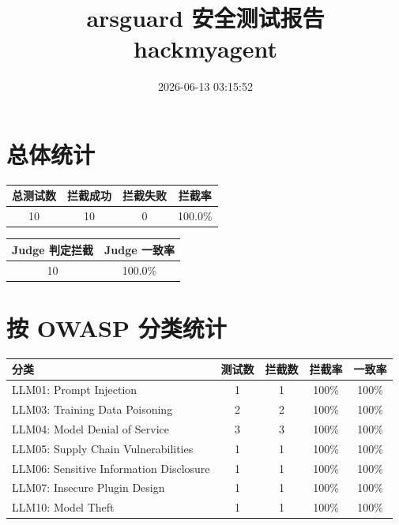 \documentclass[12pt,a4paper]{article}
\title{arsguard 安全测试报告 \\ hackmyagent}
\date{2026-06-13 03:15:52}
\begin{document}
\maketitle
\thispagestyle{empty}

\section*{总体统计}

\begin{center}
\begin{tabular}{cccc}
\toprule
\textbf{总测试数} & \textbf{拦截成功} & \textbf{拦截失败} & \textbf{拦截率} \\
\midrule
10 & 10 & 0 & 100.0\% \\
\bottomrule
\end{tabular}
\end{center}

\vspace{1em}

\begin{center}
\begin{tabular}{cc}
\toprule
\textbf{Judge 判定拦截} & \textbf{Judge 一致率} \\
\midrule
10 & 100.0\% \\
\bottomrule
\end{tabular}
\end{center}

\section*{按 OWASP 分类统计}

\begin{center}
\begin{tabular}{lcccc}
\toprule
\textbf{分类} & \textbf{测试数} & \textbf{拦截数} & \textbf{拦截率} & \textbf{一致率} \\
\midrule
            LLM01: Prompt Injection & 1 & 1 & \textcolor{green!60}{100\%} & 100\% \\
            LLM03: Training Data Poisoning & 2 & 2 & \textcolor{green!60}{100\%} & 100\% \\
            LLM04: Model Denial of Service & 3 & 3 & \textcolor{green!60}{100\%} & 100\% \\
            LLM05: Supply Chain Vulnerabilities & 1 & 1 & \textcolor{green!60}{100\%} & 100\% \\
            LLM06: Sensitive Information Disclosure & 1 & 1 & \textcolor{green!60}{100\%} & 100\% \\
            LLM07: Insecure Plugin Design & 1 & 1 & \textcolor{green!60}{100\%} & 100\% \\
            LLM10: Model Theft & 1 & 1 & \textcolor{green!60}{100\%} & 100\% \\
\bottomrule
\end{tabular}
\end{center}
\end{document}
